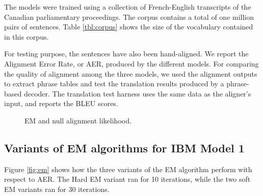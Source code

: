 \documentclass[12pt]{article}   %
\begin{document}
The models were trained using a collection of French-English transcripts of the Canadian parliamentary proceedings. The corpus contains a total of one million pairs of sentences. Table \ref{tbl:corpus} shows the size of the vocabulary contained in this corpus.

For testing purpose, the sentences have also been hand-aligned. We report the Alignment Error Rate, or AER, produced by the different models. For comparing the quality of alignment among the three models, we used the alignment outputs to extract phrase tables and test the translation results produced by a phrase-based decoder. The translation test harness uses the same data as the aligner's input, and reports the BLEU scores.


\begin{figure}[h*]
\centering
{}
\label{fig:params}
\caption{EM and null alignment likelihood.}
\end{figure}


\subsection{Variants of EM algorithms for IBM Model 1}
Figure \ref{fig:em} shows how the three variants of the EM algorithm perform with respect to AER. The Hard EM variant ran for 10 iterations, while the two soft EM variants ran for 30 iterations.
\end{document}
